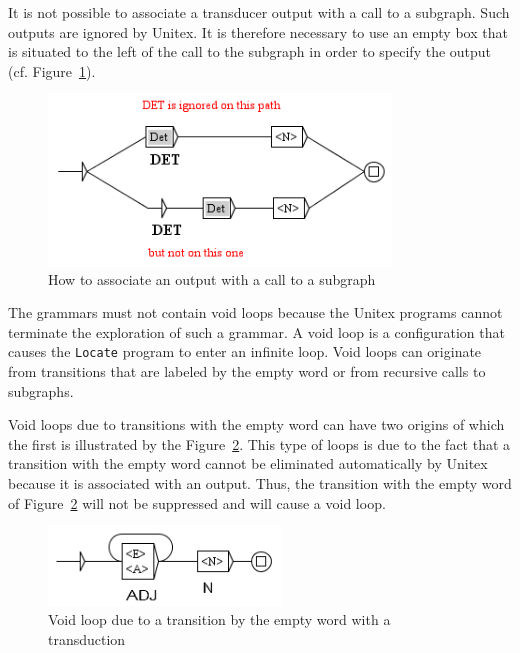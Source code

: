 \bigskip
\noindent It is not possible to associate a transducer output with a call to a
subgraph. Such outputs are ignored by Unitex. It is therefore necessary to use an empty
box that is situated to the left of the call to the subgraph in order to specify the
output (cf. Figure~\ref{fig-subgraph-output}).

\bigskip
\begin{figure}[!h]
\begin{center}
\includegraphics[width=9.1cm]{resources/img/fig6-7.png}
\caption{How to associate an output with a call to a subgraph\label{fig-subgraph-output}}
\end{center}
\end{figure}

\noindent The grammars must not contain void loops because the Unitex programs
cannot terminate the exploration of such a grammar. A void loop is a configuration that
causes the \verb+Locate+ program to enter an infinite loop.
Void loops can originate  from
transitions that are labeled by the empty word or from recursive calls to
subgraphs.

\bigskip
\noindent Void loops due to transitions with the empty word  can have two
origins of which the first is illustrated by the 
Figure~\ref{fig-epsilon-output-loop}.
This type of loops is due to the fact that a transition with the
empty word cannot be eliminated automatically by Unitex because it is associated with an
output. Thus, the transition with the empty word of
Figure~\ref{fig-epsilon-output-loop} will not be suppressed
and will cause a void loop.

\bigskip
\begin{figure}[!h]
\begin{center}
\includegraphics[width=6.2cm]{resources/img/fig6-8.png}
\caption{Void loop due to a transition by the empty word with a
transduction\label{fig-epsilon-output-loop}}
\end{center}
\end{figure}

